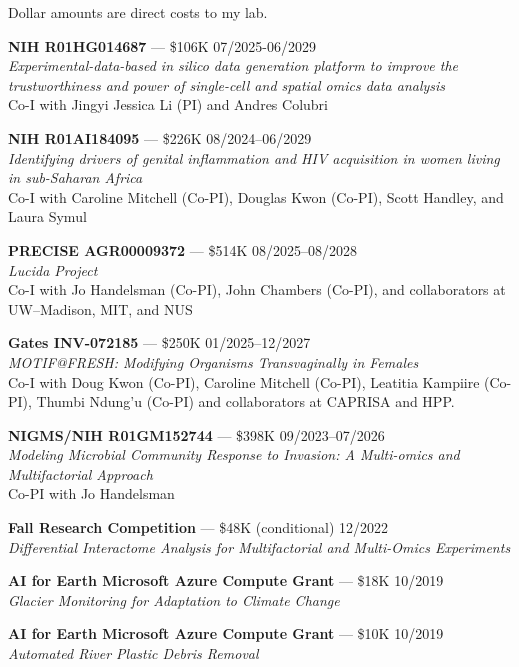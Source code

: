 \documentclass[letterpaper]{article}
\renewenvironment{itemize}{
  \begin{list}{}{
    \setlength{\leftmargin}{1.5em}
  }
}{
  \end{list}
}
\begin{document}
Dollar amounts are direct costs to my lab.

\begin{itemize}
    \item \textbf{NIH R01HG014687} — \$106K \hfill 07/2025-06/2029 \\
          \textit{Experimental-data-based in silico data generation platform to improve the trustworthiness and power of single-cell and spatial omics data analysis} \\
          Co-I with Jingyi Jessica Li (PI) and Andres Colubri

    \item \textbf{NIH R01AI184095} — \$226K \hfill 08/2024–06/2029 \\
          \textit{Identifying drivers of genital inflammation and HIV acquisition in women living in sub-Saharan Africa} \\
          Co-I with Caroline Mitchell (Co-PI), Douglas Kwon (Co-PI), Scott Handley, and Laura Symul

    \item \textbf{PRECISE AGR00009372} — \$514K \hfill 08/2025–08/2028 \\
          \textit{Lucida Project} \\
          Co-I with Jo Handelsman (Co-PI), John Chambers (Co-PI), and collaborators at UW–Madison, MIT, and NUS

    \item \textbf{Gates INV-072185} — \$250K \hfill 01/2025–12/2027 \\
          \textit{MOTIF@FRESH: Modifying Organisms Transvaginally in Females} \\
          Co-I with Doug Kwon (Co-PI), Caroline Mitchell (Co-PI), Leatitia
          Kampiire (Co-PI), Thumbi Ndung’u (Co-PI) and collaborators at CAPRISA
          and HPP.

    \item \textbf{NIGMS/NIH R01GM152744} — \$398K \hfill 09/2023–07/2026 \\
          \textit{Modeling Microbial Community Response to Invasion: A Multi-omics and Multifactorial Approach} \\
          Co-PI with Jo Handelsman

    \item \textbf{Fall Research Competition} — \$48K (conditional) \hfill 12/2022 \\
          \textit{Differential Interactome Analysis for Multifactorial and Multi-Omics Experiments}

    \item \textbf{AI for Earth Microsoft Azure Compute Grant} — \$18K \hfill 10/2019 \\
          \textit{Glacier Monitoring for Adaptation to Climate Change}

    \item \textbf{AI for Earth Microsoft Azure Compute Grant} — \$10K \hfill 10/2019 \\
          \textit{Automated River Plastic Debris Removal}
\end{itemize}
\end{document}

